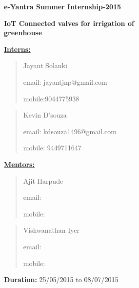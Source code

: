 \documentclass[16pt]{article}
\begin{document}
\begin{titlepage}
 
       

       \hfill\hfill\hfill

       {\LARGE{\textbf{e-Yantra Summer Internship-2015 \\ }}}
       
       \vspace{0.5cm}
       {\Large{\textbf{IoT Connected valves for irrigation of}}} \\  
      
       
        {\Large{\textbf{\hspace{3.2cm} greenhouse}}}
        
         \vspace{0.5cm}
        {\underline{\textbf{Interns:}}} \\
        \begin{quote}
        	Jayant Solanki
        	
        	email: jayantjnp@gmail.com		
        	
        	mobile:9044775938
        \end{quote}
        
        
		
		\begin{quote}
			Kevin D'souza
			
			email: kdsouza1496@gmail.com
			
			mobile: 9449711647
		\end{quote}
        
        
        \vspace{1cm}
        
          {\underline{\textbf{Mentors:}}} \\
          \begin{quote}
          Ajit Harpude 
          
          email: 
        
          mobile: \\
        \end{quote}
          \begin{quote}
          Vishwanathan Iyer
          
          email: 
        
          mobile:  \\
          \end{quote}
          \textbf{Duration:} 25/05/2015 to 08/07/2015
          
\end{titlepage}
\tableofcontents
\vspace{15cm }
\end{document}
